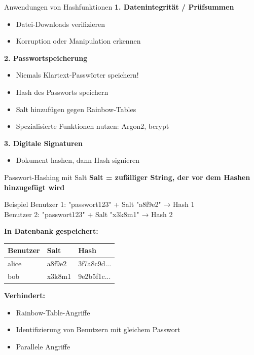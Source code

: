 \documentclass[handout]{beamer}
\begin{document}
\begin{frame}{Anwendungen von Hashfunktionen}
\textbf{1. Datenintegrität / Prüfsummen}
\begin{itemize}
    \item Datei-Downloads verifizieren
    \item Korruption oder Manipulation erkennen
\end{itemize}

\vspace{0.3cm}
\textbf{2. Passwortspeicherung}
\begin{itemize}
    \item Niemals Klartext-Passwörter speichern!
    \item Hash des Passworts speichern
    \item Salt hinzufügen gegen Rainbow-Tables
    \item Spezialisierte Funktionen nutzen: Argon2, bcrypt
\end{itemize}

\vspace{0.3cm}
\textbf{3. Digitale Signaturen}
\begin{itemize}
    \item Dokument hashen, dann Hash signieren
\end{itemize}

\end{frame}

\begin{frame}[fragile]{Passwort-Hashing mit Salt}
\textbf{Salt = zufälliger String, der vor dem Hashen hinzugefügt wird}

\vspace{0.3cm}
\begin{exampleblock}{Beispiel}
Benutzer 1: "passwort123" + Salt "a8f9e2" → Hash 1\\
Benutzer 2: "passwort123" + Salt "x3k8m1" → Hash 2
\end{exampleblock}

\vspace{0.3cm}
\textbf{In Datenbank gespeichert:}
\begin{center}
\begin{tabular}{|l|l|l|}
\hline
\textbf{Benutzer} & \textbf{Salt} & \textbf{Hash} \\
\hline
alice & a8f9e2 & 3f7a8c9d... \\
bob & x3k8m1 & 9e2b5f1c... \\
\hline
\end{tabular}
\end{center}

\textbf{Verhindert:}
\begin{itemize}
    \item Rainbow-Table-Angriffe
    \item Identifizierung von Benutzern mit gleichem Passwort
    \item Parallele Angriffe
\end{itemize}
\end{frame}
\end{document}
